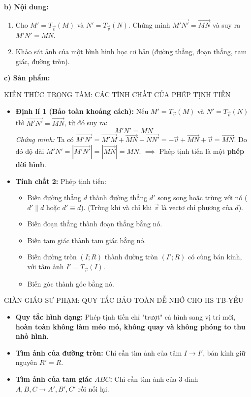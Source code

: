 \documentclass[12pt, a4paper]{article}
\renewcommand{\vec}[1]{\overrightarrow{#1}}
\begin{document}
\noindent \textbf{b) Nội dung:}  
\begin{enumerate}[leftmargin=0.6cm]  
    \item Cho $M' = T_{\vec{v}}(M)$ và $N' = T_{\vec{v}}(N)$. Chứng minh $\vec{M'N'} = \vec{MN}$ và suy ra $M'N' = MN$.  
    \item Khảo sát ảnh của một hình hình học cơ bản (đường thẳng, đoạn thẳng, tam giác, đường tròn).  
\end{enumerate}  
  
\noindent \textbf{c) Sản phẩm:}  
  
\begin{pedabox}{KIẾN THỨC TRỌNG TÂM: CÁC TÍNH CHẤT CỦA PHÉP TỊNH TIẾN}  
\begin{itemize}[leftmargin=0.6cm]  
    \item \textbf{Định lí 1 (Bảo toàn khoảng cách):}  
    Nếu $M' = T_{\vec{v}}(M)$ và $N' = T_{\vec{v}}(N)$ thì $\vec{M'N'} = \vec{MN}$, từ đó suy ra:  
    $$M'N' = MN$$  
    \textit{Chứng minh:} Ta có $\vec{M'N'} = \vec{M'M} + \vec{MN} + \vec{NN'} = -\vec{v} + \vec{MN} + \vec{v} = \vec{MN}$.  
    Do đó độ dài $M'N' = |\vec{M'N'}| = |\vec{MN}| = MN$.  
    $\implies$ Phép tịnh tiến là một \textbf{phép dời hình}.  
    \item \textbf{Tính chất 2:} Phép tịnh tiến:  
    \begin{itemize}  
        \item Biến đường thẳng $d$ thành đường thẳng $d'$ song song hoặc trùng với nó ($d' \parallel d$ hoặc $d' \equiv d$).  
        (Trùng khi và chỉ khi $\vec{v}$ là vectơ chỉ phương của $d$).  
        \item Biến đoạn thẳng thành đoạn thẳng bằng nó.  
        \item Biến tam giác thành tam giác bằng nó.  
        \item Biến đường tròn $(I; R)$ thành đường tròn $(I'; R)$ có cùng bán kính, với tâm ảnh $I' = T_{\vec{v}}(I)$.  
        \item Biến góc thành góc bằng nó.  
    \end{itemize}  
\end{itemize}  
\end{pedabox}  
  
\begin{scaffoldbox}{GIÀN GIÁO SƯ PHẠM: QUY TẮC BẢO TOÀN DỄ NHỚ CHO HS TB-YẾU}  
\begin{itemize}[leftmargin=0.6cm]  
    \item \textbf{Quy tắc hình dạng:} Phép tịnh tiến chỉ "trượt" cả hình sang vị trí mới, \textbf{hoàn toàn không làm méo mó, không quay và không phóng to thu nhỏ hình}.  
    \item \textbf{Tìm ảnh của đường tròn:} Chỉ cần tìm ảnh của tâm $I \to I'$, bán kính giữ nguyên $R' = R$.  
    \item \textbf{Tìm ảnh của tam giác $ABC$:} Chỉ cần tìm ảnh của 3 đỉnh $A, B, C \to A', B', C'$ rồi nối lại.  
\end{itemize}  
\end{scaffoldbox}  
  
\end{document}
